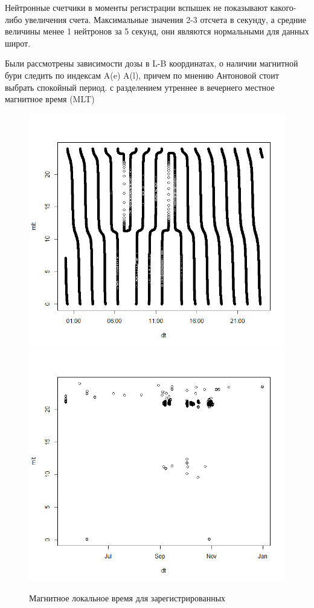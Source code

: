 Нейтронные счетчики в моменты регистрации вспышек не показывают какого-либо увеличения счета. Максимальные значения 2-3 отсчета в секунду, а средние величины менее 1 нейтронов за 5 секунд, они являются нормальными для данных широт.

Были рассмотрены зависимости дозы в L-B координатах, о наличии магнитной бури следить по индексам A(e) A(l), причем по мнению Антоновой стоит выбрать спокойный период. с разделением утреннее в вечернего местное магнитное время (MLT) 

\begin{figure}
	\centering
	\includegraphics[width=0.49\linewidth]{images/Flash/Rplot15}
	\includegraphics[width=0.49\linewidth]{images/Flash/Rplot14}
	\caption{Магнитное локальное время для зарегистрированных }
	\label{fig:rplot15}
\end{figure}






